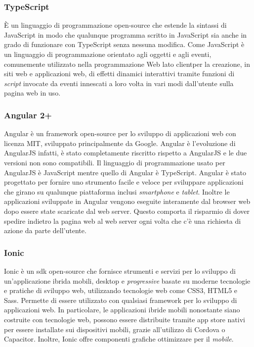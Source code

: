 \subsubsection*{TypeScript}
È un linguaggio di programmazione \gls{open-source}\ap{[g]} che estende la sintassi di JavaScript in modo che qualunque programma scritto in JavaScript sia anche in grado di funzionare con TypeScript senza nessuna modifica. Come JavaScript è un linguaggio di programmazione orientato agli oggetti e agli eventi, comunemente utilizzato nella programmazione Web lato \gls{client}\glsfirstoccur per la creazione, in siti web e applicazioni web, di effetti dinamici interattivi tramite funzioni di \emph{script} invocate da eventi innescati a loro volta in vari modi dall'utente sulla pagina web in uso.

\subsubsection*{Angular 2+}
Angular è un \gls{framework}\ap{[g]} \gls{open-source}\ap{[g]} per lo sviluppo di applicazioni web con \gls{licenza MIT}\ap{[g]}, sviluppato principalmente da Google. Angular è l'evoluzione di AngularJS infatti, è stato completamente riscritto rispetto a AngularJS e le due versioni non sono compatibili. Il linguaggio di programmazione usato per AngularJS è JavaScript mentre quello di Angular è TypeScript. Angular è stato progettato per fornire uno strumento facile e veloce per sviluppare applicazioni che girano su qualunque piattaforma inclusi \emph{smartphone} e \emph{tablet}. Inoltre le applicazioni sviluppate in Angular vengono eseguite interamente dal \gls{browser web}\ap{[g]} dopo essere state scaricate dal web \gls{server}\ap{[g]}. Questo comporta il risparmio di dover spedire indietro la pagina web al web \gls{server}\ap{[g]} ogni volta che c'è una richiesta di azione da parte dell'utente. 

\subsubsection*{Ionic}
Ionic è un \gls{sdk} \gls{open-source}\ap{[g]} che fornisce strumenti e servizi per lo sviluppo di un'\gls{applicazione ibrida}\ap{[g]} mobili, desktop e \emph{progressive} basate su moderne tecnologie e pratiche di sviluppo web, utilizzando tecnologie web come \gls{CSS}3, \gls{HTML}5 e \gls{Sass}. Permette di essere utilizzato con qualsiasi \gls{framework}\ap{[g]} per lo sviluppo di applicazioni web. In particolare, le applicazioni ibride mobili nonostante siano costruite con tecnologie web, possono essere distribuite tramite app store nativi per essere installate sui dispositivi mobili, grazie all'utilizzo di  Cordova o Capacitor. Inoltre, Ionic offre componenti grafiche ottimizzare per il \emph{mobile}.

